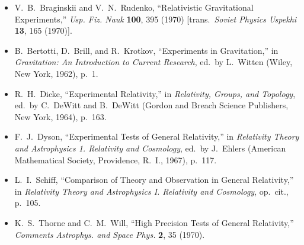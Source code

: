 

\begin{itemize}
  \item[\(\square\)] V.~B.~Braginskii and V.~N.~Rudenko,
  ``Relativistic Gravitational Experiments,'' \emph{Usp. Fiz. Nauk}
  \textbf{100}, 395 (1970) [trans.\ \emph{Soviet Physics Uspekhi}
  \textbf{13}, 165 (1970)].

  \item[\(\square\)] B.~Bertotti, D.~Brill, and R.~Krotkov,
  ``Experiments in Gravitation,'' in \emph{Gravitation: An Introduction to
  Current Research}, ed.\ by L.~Witten (Wiley, New York, 1962), p.~1.

  \item[\(\square\)] R.~H.~Dicke, ``Experimental Relativity,'' in
  \emph{Relativity, Groups, and Topology}, ed.\ by C.~DeWitt and
  B.~DeWitt (Gordon and Breach Science Publishers, New York, 1964),
  p.~163.

  \item[\(\square\)] F.~J.~Dyson, ``Experimental Tests of General
  Relativity,'' in \emph{Relativity Theory and Astrophysics 1. Relativity
  and Cosmology}, ed.\ by J.~Ehlers (American Mathematical Society,
  Providence, R.~I., 1967), p.~117.

  \item[\(\square\)] L.~I.~Schiff, ``Comparison of Theory and Observation
  in General Relativity,'' in \emph{Relativity Theory and Astrophysics I.
  Relativity and Cosmology}, op.\ cit., p.~105.

  \item[\(\square\)] K.~S.~Thorne and C.~M.~Will, ``High Precision Tests
  of General Relativity,'' \emph{Comments Astrophys. and Space Phys.}
  \textbf{2}, 35 (1970).
\end{itemize}


